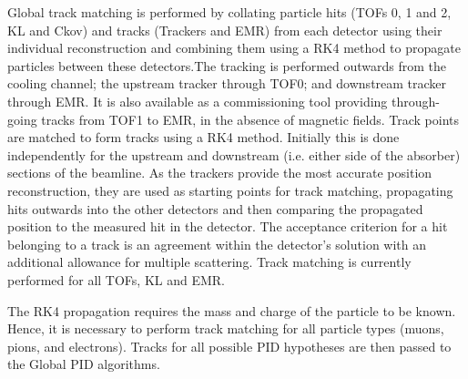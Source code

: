 \documentclass{JINST}
\begin{document}
Global track matching is performed by collating particle hits (TOFs 0, 1 and 2, KL and Ckov) and tracks (Trackers and EMR) from each detector using their individual reconstruction and combining them using a RK4 method to propagate particles between these detectors.The tracking is performed outwards from the cooling channel; the upstream tracker through TOF0; and downstream tracker through EMR.  It is also available as a commissioning tool providing through-going tracks from TOF1 to EMR, in the absence of magnetic fields.
%
%
Track points are matched to form tracks using a RK4 method. Initially this is done independently for the upstream and downstream (i.e. either side of the absorber) sections of the beamline. As the trackers provide the most accurate position reconstruction, they are used as starting points for track matching, propagating hits outwards into the other detectors and then comparing the propagated position to the measured hit in the detector. The acceptance criterion for a hit belonging to a track is an agreement within the detector's solution with an additional allowance for multiple scattering.  Track matching is currently performed for all TOFs, KL and EMR. 

The RK4 propagation requires the mass and charge of the particle to be known. Hence, it is necessary to perform track matching for all particle types (muons, pions, and electrons). Tracks for all possible PID hypotheses are then passed to the Global PID algorithms. 

%

\end{document}

